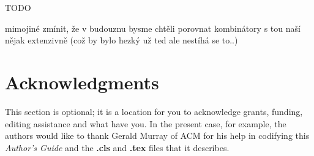\documentclass{sig-alternate}
\newenvironment{lizt}
{\begin{easylist}[itemize]}
{\end{easylist}}
\newcommand{\red}[1]{{\color{red} #1}}
\begin{document}
TODO

\red{mimojiné zmínit, že v budouznu bysme chtěli porovnat kombinátory 
s tou naší nějak extenzivně (což by bylo hezký už ted ale nestíhá se to..)}


\section{Acknowledgments}
This section is optional; it is a location for you
to acknowledge grants, funding, editing assistance and
what have you.  In the present case, for example, the
authors would like to thank Gerald Murray of ACM for
his help in codifying this \textit{Author's Guide}
and the \textbf{.cls} and \textbf{.tex} files that it describes.



%

%
%


\end{document}
